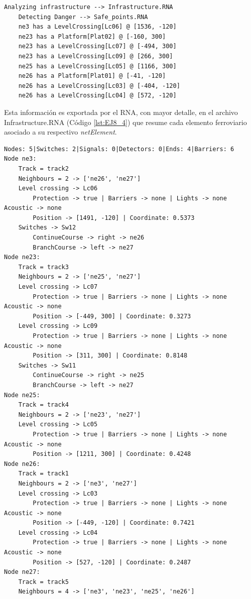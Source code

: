 	\begin{lstlisting}[language = {}, caption = Detección de puntos críticos por parte del RNA , label = {lst:EJ8_2}]
	Analyzing infrastructure --> Infrastructure.RNA
	Detecting Danger --> Safe_points.RNA
	ne3 has a LevelCrossing[Lc06] @ [1536, -120]
	ne23 has a Platform[Plat02] @ [-160, 300]
	ne23 has a LevelCrossing[Lc07] @ [-494, 300]
	ne23 has a LevelCrossing[Lc09] @ [266, 300]
	ne25 has a LevelCrossing[Lc05] @ [1166, 300]
	ne26 has a Platform[Plat01] @ [-41, -120]
	ne26 has a LevelCrossing[Lc03] @ [-404, -120]
	ne26 has a LevelCrossing[Lc04] @ [572, -120]
	\end{lstlisting}
	
	Esta información es exportada por el RNA, con mayor detalle, en el archivo Infrastructure.RNA (Código \ref{lst:EJ8_4}) que resume cada elemento ferroviario asociado a su respectivo \textit{netElement}.
	
	\begin{lstlisting}[language = {}, caption = Infrastructure.RNA, label = {lst:EJ8_4}]
Nodes: 5|Switches: 2|Signals: 0|Detectors: 0|Ends: 4|Barriers: 6
Node ne3:
	Track = track2
	Neighbours = 2 -> ['ne26', 'ne27']
	Level crossing -> Lc06
		Protection -> true | Barriers -> none | Lights -> none Acoustic -> none
		Position -> [1491, -120] | Coordinate: 0.5373
	Switches -> Sw12
		ContinueCourse -> right -> ne26
		BranchCourse -> left -> ne27
Node ne23:
	Track = track3
	Neighbours = 2 -> ['ne25', 'ne27']
	Level crossing -> Lc07
		Protection -> true | Barriers -> none | Lights -> none Acoustic -> none
		Position -> [-449, 300] | Coordinate: 0.3273
	Level crossing -> Lc09
		Protection -> true | Barriers -> none | Lights -> none Acoustic -> none
		Position -> [311, 300] | Coordinate: 0.8148
	Switches -> Sw11
		ContinueCourse -> right -> ne25
		BranchCourse -> left -> ne27
Node ne25:
	Track = track4
	Neighbours = 2 -> ['ne23', 'ne27']
	Level crossing -> Lc05
		Protection -> true | Barriers -> none | Lights -> none Acoustic -> none
		Position -> [1211, 300] | Coordinate: 0.4248
Node ne26:
	Track = track1
	Neighbours = 2 -> ['ne3', 'ne27']
	Level crossing -> Lc03
		Protection -> true | Barriers -> none | Lights -> none Acoustic -> none
		Position -> [-449, -120] | Coordinate: 0.7421
	Level crossing -> Lc04
		Protection -> true | Barriers -> none | Lights -> none Acoustic -> none
		Position -> [527, -120] | Coordinate: 0.2487
Node ne27:
	Track = track5
	Neighbours = 4 -> ['ne3', 'ne23', 'ne25', 'ne26']
	\end{lstlisting}
	
